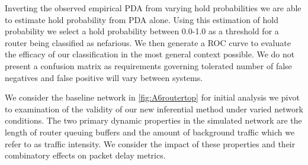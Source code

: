   Inverting the observed empirical PDA from varying hold probabilities we are able to estimate hold probability from PDA alone. Using this estimation of hold probability we select a hold probability between 0.0-1.0 as a threshold for a router being classified as nefarious. We then generate a ROC curve to evaluate the efficacy of our classification in the most general context possible. We do not present a confusion matrix  as requirements governing tolerated number of false negatives and false positive will vary between systems.\par
  
  We consider the baseline network in \cref{fig:A6routertop} for initial analysis we pivot to examination of the validity of our new inferential method under varied network conditions. The two primary dynamic properties in the simulated network are the length of router queuing buffers and the amount of background traffic which we refer to as traffic intensity. We consider the impact of these properties and their combinatory effects on packet delay metrics.\par
